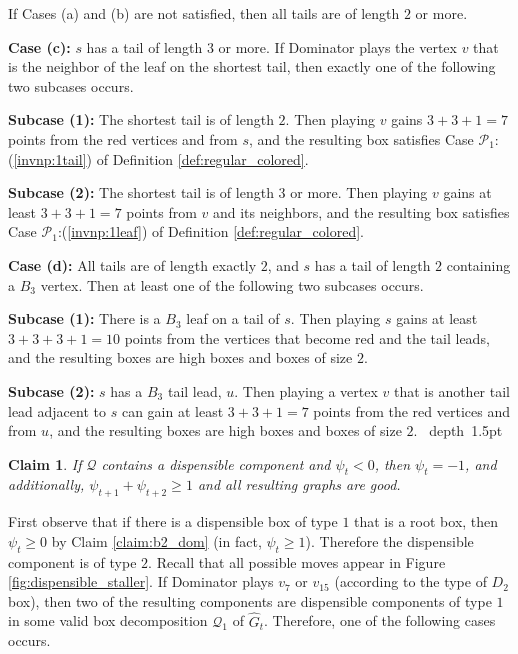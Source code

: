 \documentclass[11pt]{article}
\def\Proof{\par\noindent{\bf Proof:~}}
\def\blackslug{\hbox{\hskip 1pt \vrule width 4pt height 8pt
    depth 1.5pt \hskip 1pt}}
\def\QED{\quad\blackslug\lower 8.5pt\null\par}
\newtheorem{claim}[theorem]{Claim}
\theoremstyle{definition}
\def\propbr{\mathcal{P}_1}
\begin{document}
\smallskip
\par\noindent
If Cases (a) and (b) are not satisfied, then all tails are of length $2$ or more.

\smallskip
\par\noindent
{\bf Case (c):}
$s$ has a tail of length $3$ or more.
If Dominator plays the vertex $v$ that is the neighbor of the leaf on the shortest tail, then exactly one of the following two subcases occurs.
\smallskip
\par\noindent
{\bf Subcase (1):}
	The shortest tail is of length $2$. 
	Then playing $v$ gains $3 + 3 + 1 = 7$ points from the red vertices and from $s$, and the resulting box satisfies Case $\propbr$:(\ref{invnp:1tail}) of Definition \ref{def:regular_colored}.
\smallskip
\par\noindent
{\bf Subcase (2):}
	The shortest tail is of length $3$ or more.
	Then playing $v$ gains at least $3 + 3 + 1 = 7$ points from $v$ and its neighbors, and the resulting box satisfies Case $\propbr$:(\ref{invnp:1leaf}) of Definition \ref{def:regular_colored}.

\bigskip
\par\noindent
{\bf Case (d):}
All tails are of length exactly $2$, and $s$ has a tail of length $2$ containing a $B_3$ vertex.
Then at least one of the following two subcases occurs.
\smallskip
\par\noindent
{\bf Subcase (1):}
	There is a $B_3$ leaf on a tail of $s$.
	Then playing $s$ gains at least $3 + 3 + 3 + 1 = 10$ points from the vertices that become red and the tail leads, and the resulting boxes are high boxes and boxes of size $2$.
\smallskip
\par\noindent
{\bf Subcase (2):}
	$s$ has a $B_3$ tail lead, $u$.
	Then playing a vertex $v$ that is another tail lead adjacent to $s$ can gain at least $3 + 3 + 1 = 7$ points from the red vertices and from $u$, 
	and the resulting boxes are high boxes and boxes of size $2$.
\QED

\begin{claim}
\label{claim:t4_dom}
If $\mathcal{Q}$ contains a dispensible component and $\psi_t < 0$, then $\psi_t = -1$, and additionally, $\psi_{t+1} + \psi_{t+2} \geq 1$ and all resulting graphs are good.
\end{claim}
\Proof
First observe that if there is a dispensible box of type $1$ that is a root box, then $\psi_t \geq 0$ by Claim \ref{claim:b2_dom} (in fact, $\psi_t \geq 1$).
Therefore the dispensible component is of type $2$.
Recall that all possible moves appear in Figure \ref{fig:dispensible_staller}.
If Dominator plays $v_7$ or $v_{15}$ (according to the type of $D_2$ box), 
then two of the resulting components are dispensible components of type $1$ in some valid box decomposition $\mathcal{Q}_1$ of $\hat{G}_t$.
Therefore, one of the following cases occurs.
\end{document}
